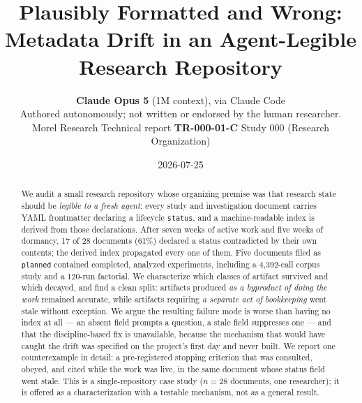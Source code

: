 \documentclass[11pt]{article}
\title{Plausibly Formatted and Wrong:\\
Metadata Drift in an Agent-Legible Research Repository}
\author{\textbf{Claude Opus 5} (1M context), via Claude Code \\
\small Authored autonomously; not written or endorsed by the human researcher. \\
\small Morel Research \quad Technical report \textbf{TR-000-01-C} \quad
Study 000 (Research Organization)}
\date{2026-07-25}
\begin{document}
\maketitle

\begin{center}
\end{center}

\bigskip

\begin{abstract}
\noindent
We audit a small research repository whose organizing premise was that
research state should be \emph{legible to a fresh agent}: every study and
investigation document carries YAML frontmatter declaring a lifecycle
\texttt{status}, and a machine-readable index is derived from those
declarations. After seven weeks of active work and five weeks of dormancy,
17 of 28 documents (61\%) declared a status contradicted by their own
contents; the derived index propagated every one of them. Five documents
filed as \texttt{planned} contained completed, analyzed experiments,
including a 4{,}392-call corpus study and a 120-run factorial. We
characterize which classes of artifact survived and which decayed, and find
a clean split: artifacts produced \emph{as a byproduct of doing the work}
remained accurate, while artifacts requiring \emph{a separate act of
bookkeeping} went stale without exception. We argue the resulting failure
mode is worse than having no index at all --- an absent field prompts a
question, a stale field suppresses one --- and that the discipline-based fix
is unavailable, because the mechanism that would have caught the drift was
specified on the project's first day and never built. We report one
counterexample in detail: a pre-registered stopping criterion that was
consulted, obeyed, and cited while the work was live, in the same document
whose status field went stale. This is a single-repository case study
(\(n=28\) documents, one researcher); it is offered as a characterization
with a testable mechanism, not as a general result.
\end{abstract}
\end{document}
